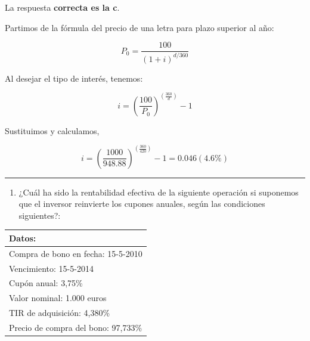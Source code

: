 \documentclass[
  letterpaper,
  DIV=11,
  numbers=noendperiod]{scrreprt}
\providecommand{\tightlist}{%
  \setlength{\itemsep}{0pt}\setlength{\parskip}{0pt}}\usepackage{longtable,booktabs,array}
\begin{document}
\begin{tcolorbox}[enhanced jigsaw, left=2mm, opacityback=0, colback=white, breakable, arc=.35mm, bottomrule=.15mm, rightrule=.15mm, toprule=.15mm, leftrule=.75mm, colframe=quarto-callout-tip-color-frame]
\begin{minipage}[t]{5.5mm}
\textcolor{quarto-callout-tip-color}{\faLightbulb}
\end{minipage}%
\begin{minipage}[t]{\textwidth - 5.5mm}

La respuesta \textbf{correcta es la c}.

Partimos de la fórmula del precio de una letra para plazo superior al
año:

\[P_0=\frac{100}{(1+i)^{d/360}}\]

Al desejar el tipo de interés, tenemos:

\[i=\left(\frac{100}{P_0}\right)^{\left(\frac{360}{d}\right) }-1\]

Sustituimos y calculamos,

\[i=\left(\frac{1000}{948.88}\right)^{\left(\frac{360}{420}\right) }-1=0.046(4.6\%)\]

\end{minipage}%
\end{tcolorbox}

\begin{center}\rule{0.5\linewidth}{0.5pt}\end{center}

\begin{enumerate}
\def\labelenumi{\arabic{enumi}.}
\setcounter{enumi}{10}
\tightlist
\item
  ¿Cuál ha sido la rentabilidad efectiva de la siguiente operación si
  suponemos que el inversor reinvierte los cupones anuales, según las
  condiciones siguientes?:
\end{enumerate}

\begin{longtable}[]{@{}l@{}}
\toprule()
\textbf{Datos:} \\
\midrule()
\endhead
Compra de bono en fecha: 15-5-2010 \\
Vencimiento: 15-5-2014 \\
Cupón anual: 3,75\% \\
Valor nominal: 1.000 euros \\
TIR de adquisición: 4,380\% \\
Precio de compra del bono: 97,733\% \\
\bottomrule()
\end{longtable}
\end{document}
